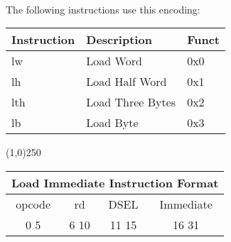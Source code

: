 \documentclass[letterpaper, 11pt]{article}
\begin{document}
\paragraph{}The following instructions use this encoding: \\
\begin{center}
	\begin{tabular}{|l|l|l|} \hline
			Instruction & Description 						& Funct\\ \hline
			lw			& Load Word							& 0x0 \\ \hline
			lh			& Load Half Word					& 0x1 \\ \hline
			lth			& Load Three Bytes					& 0x2 \\ \hline
			lb			& Load Byte							& 0x3 \\ \hline


\end{tabular}
\end{center}
\begin{center}
	\line(1,0){250}
\end{center}

\begin{center}
		\begin{tabular}{|c|c|c|c|}
			\multicolumn{4}{c}{Load Immediate Instruction Format}\\ \hline
			\hspace{2pt} opcode \hspace{2pt} & \hspace{5pt} rd \hspace{5pt} &  \hspace{4pt} DSEL \hspace{4pt} & \hspace{10pt}Immediate  \hspace{10pt}   \\	\hline
			0 \hfill 5&6 \hfill 10&11 \hfill  15& 16  \hfill   31\\ \hline
		
	\end{tabular}
\end{center}
\end{document}

